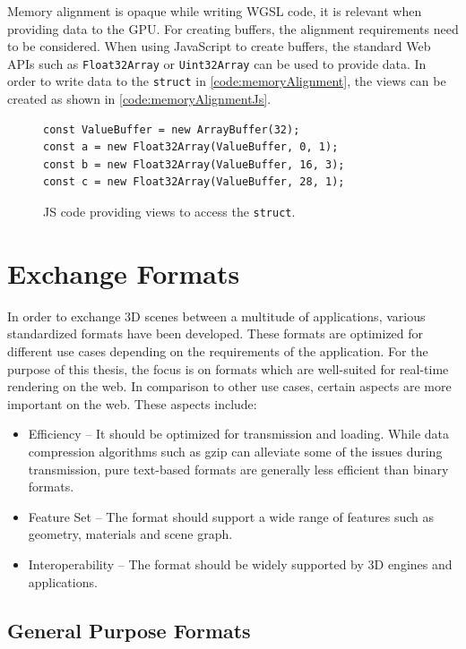 Memory alignment is opaque while writing WGSL code, it is relevant when providing data to the GPU. For creating buffers, the alignment requirements need to be considered. When using JavaScript to create buffers, the standard Web APIs such as \texttt{Float32Array} or \texttt{Uint32Array} can be used to provide data. In order to write data to the \texttt{struct} in \autoref{code:memoryAlignment}, the views can be created as shown in \autoref{code:memoryAlignmentJs}.

\begin{figure}[H]
  \begin{lstlisting}[style=JavaScript]
const ValueBuffer = new ArrayBuffer(32);
const a = new Float32Array(ValueBuffer, 0, 1);
const b = new Float32Array(ValueBuffer, 16, 3);
const c = new Float32Array(ValueBuffer, 28, 1);
  \end{lstlisting}
  \caption{JS code providing views to access the \texttt{struct}.}
  \label{code:memoryAlignmentJs}
\end{figure}


\section{Exchange Formats}

In order to exchange 3D scenes between a multitude of applications, various standardized formats have been developed. These formats are optimized for different use cases depending on the requirements of the application. For the purpose of this thesis, the focus is on formats which are well-suited for real-time rendering on the web. In comparison to other use cases, certain aspects are more important on the web. These aspects include:

\begin{itemize}
    \item{Efficiency} – It should be optimized for transmission and loading. While data compression algorithms such as gzip can alleviate some of the issues during transmission, pure text-based formats are generally less efficient than binary formats.
    \item{Feature Set} – The format should support a wide range of features such as geometry, materials and scene graph.
    \item{Interoperability} – The format should be widely supported by 3D engines and applications.
\end{itemize}

\subsection{General Purpose Formats}

